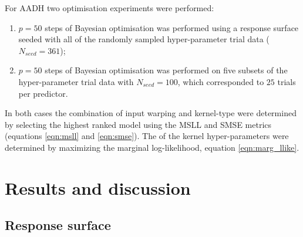For AADH two optimisation experiments were performed:
\begin{enumerate}
    \item $p=50$ steps of Bayesian optimisation was performed using a response surface seeded with all of the randomly sampled hyper-parameter trial data ($N_{seed}=361$);
    \item $p=50$ steps of Bayesian optimisation was performed on five subsets  of the hyper-parameter trial data with  $N_{seed}=100$, which corresponded to $25$ trials per predictor.
\end{enumerate} 

In both cases the combination of input warping and kernel-type  were determined by selecting the highest ranked model using the MSLL and SMSE metrics (equations \ref{eqn:msll} and \ref{eqn:smse}). The of the kernel hyper-parameters were determined by maximizing the marginal log-likelihood, equation \ref{eqn:marg_llike}. 

\section{Results and discussion}
\subsection{Response surface}\label{sec:ala_rsm}

